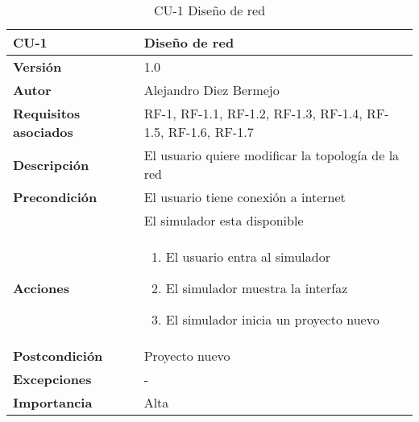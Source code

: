 \begin{table}[p]
	\centering
	\begin{tabularx}{\linewidth}{ p{} p{} }
		\toprule
		\textbf{CU-1}    & \textbf{Diseño de red}\\
		\toprule
		\textbf{Versión}              & 1.0    \\
		\textbf{Autor}                & Alejandro Diez Bermejo \\
		\textbf{Requisitos asociados} & RF-1, RF-1.1, RF-1.2, RF-1.3, RF-1.4, RF-1.5, RF-1.6, RF-1.7 \\
		\textbf{Descripción}          & El usuario quiere modificar la topología de la red \\
		\textbf{Precondición}         & El usuario tiene conexión a internet \\
                                      & El simulador esta disponible \\
		\textbf{Acciones}             &
		\begin{enumerate}\def\labelenumi{\arabic{enumi}.}\tightlist
			\item El usuario entra al simulador
			\item El simulador muestra la interfaz
            \item El simulador inicia un proyecto nuevo
		\end{enumerate}\\
		\textbf{Postcondición}        & Proyecto nuevo \\
		\textbf{Excepciones}          & - \\
		\textbf{Importancia}          & Alta \\
		\bottomrule
	\end{tabularx}
	\caption{CU-1 Diseño de red}
\end{table}

